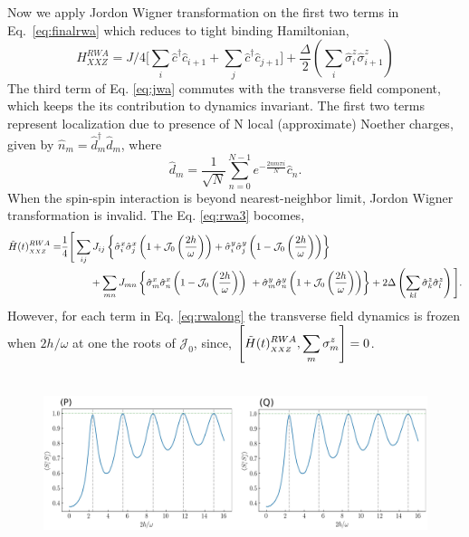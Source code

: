 \documentclass[aps,prb,reprint,showpacs,floatfix,superscriptaddress, onecolumn, nofootinbib, 9pt]{revtex4-2}
\begin{document}
\begin{enumerate}
{\begin{equation}
	\label{eq:finalrwa}
	\end{equation}
	Now we apply Jordon Wigner transformation on the first two terms in Eq.~\eqref{eq:finalrwa} which reduces to tight binding Hamiltonian, 
	\begin{equation}
	H^{RWA}_{XXZ} = J/4\big[ \sum_i\hat{c}^\dagger\hat{c}_{i+1}  + \sum_j\hat{c}^\dagger\hat{c}_{j+1}\big] + \frac{\Delta}{2}\left(\sum_{i}  \hat{\sigma}_{i}^{z} \hat{\sigma}_{i+1}^{z}\right)
	\label{eq:jwa}
	\end{equation}
	The third term of Eq. \eqref{eq:jwa} commutes with the transverse field component, which keeps the its contribution to dynamics invariant. The first two terms represent localization due to presence of N local (approximate) Noether charges, given by $\hat{n}_m= \hat{d}^{\dagger}_m\hat{d}^{\;}_m$, where
	\begin{equation}
	\hat{d}_m = \frac{1}{\sqrt{N}}\sum_{n=0}^{N-1}e^{-\frac{2nm\pi i}{N}}\hat{c}_n.
	\end{equation}
	When the spin-spin interaction is beyond nearest-neighbor limit, Jordon Wigner transformation is invalid. The Eq. \eqref{eq:rwa3} bocomes,
	\begin{align}
	\tilde{H}(t)^{RWA}_{_{XXZ}}= & \frac14\Bigg[\sum_{ij} J_{ij}\left\{ \hat{\sigma}^x_i \hat{\sigma}^x_{j}\left(1+ \mathcal{J}_0\left(\frac{2h}{\omega}\right)\right) + \hat{\sigma}^y_i \hat{\sigma}^y_{j} \left(1- \mathcal{J}_0\left(\frac{2h}{\omega}\right)\right)\right\}\nonumber\\
	& \hskip1cm + \sum_{mn} J_{mn}\left\{ \hat{\sigma}^x_m \hat{\sigma}^x_{n}\left(1- \mathcal{J}_0\left(\frac{2h}{\omega}\right)\right)\ + \hat{\sigma}^y_m \hat{\sigma}^y_{n} \left(1+ \mathcal{J}_0\left(\frac{2h}{\omega}\right)\right)\right\}+ 2\Delta \left(\sum_{kl}  \hat{\sigma}_{k}^{z} \hat{\sigma}_{l}^{z}\right)\Bigg].
	\label{eq:rwalong}
	\end{align}
	However, for each term in Eq. \eqref{eq:rwalong} the transverse field dynamics is frozen when $2h/\omega$ at one the roots of $\mathcal{J}_0$, since, $\displaystyle \comm{	\tilde{H}(t)^{RWA}_{_{XXZ}}}{\displaystyle\sum_m\sigma^z_m}=0$. 
	\begin{figure}[t]
		\includegraphics[height=5cm]{xxz_d.png}

\end{figure}}
\end{enumerate}
\end{document}
